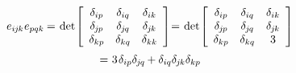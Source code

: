 \nopagebreak\vspace{-0.2em}
\begin{multline*}
e_{i\hspace{-0.1ex}j\hspace{-0.1ex}k} \hspace{.1ex} e_{pqk} \hspace{-0.1ex} = \hspace{.2ex}
\determinant \hspace{-0.25ex} \left[
\begin{array}{ccc}
\delta_{ip} & \delta_{iq} & \delta_{ik} \\
\delta_{\hspace{-0.1ex}j\hspace{-0.1ex}p} & \delta_{\hspace{-0.1ex}j\hspace{-0.1ex}q} & \delta_{\hspace{-0.1ex}j\hspace{-0.1ex}k} \\
\delta_{kp} & \delta_{kq} & \delta_{kk}
\end{array}
\right] \hspace{-0.5ex} = \hspace{.2ex}
\determinant \hspace{-0.25ex} \left[
\begin{array}{ccc}
\delta_{ip} & \delta_{iq} & \delta_{ik} \\
\delta_{\hspace{-0.1ex}j\hspace{-0.1ex}p} & \delta_{\hspace{-0.1ex}j\hspace{-0.1ex}q} & \delta_{\hspace{-0.1ex}j\hspace{-0.1ex}k} \\
\delta_{kp} & \delta_{kq} & 3
\end{array}
\right] %
\\[.2em]
%
= \hspace{.1ex} 3 \hspace{.2ex} \delta_{ip} \delta_{\hspace{-0.1ex}j\hspace{-0.1ex}q} \hspace{-0.1ex}
+ \delta_{iq} \delta_{\hspace{-0.1ex}j\hspace{-0.1ex}k} \delta_{kp} \hspace{-0.1ex}

\end{multline*}
